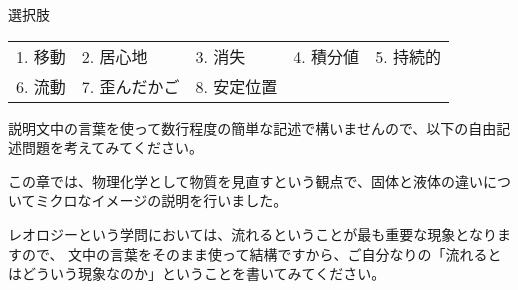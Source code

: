\documentclass[uplatex,dvipdfmx,a4paper,11pt]{jsarticle}
\begin{document}
\begin{qlist}
		\begin{itembox}[l]{選択肢}
			\begin{center}
				\begin{tabular}{lllll}
					1. 移動	&2. 居心地 	&3. 消失	&4. 積分値	&5. 持続的\\
					6. 流動	&7. 歪んだかご &8. 安定位置
				\end{tabular}
			\end{center}
		\end{itembox}
\end{qlist}

説明文中の言葉を使って数行程度の簡単な記述で構いませんので、以下の自由記述問題を考えてみてください。
\begin{qlist}
\qitem この章では、物理化学として物質を見直すという観点で、固体と液体の違いについてミクロなイメージの説明を行いました。

レオロジーという学問においては、流れるということが最も重要な現象となりますので、
文中の言葉をそのまま使って結構ですから、ご自分なりの「流れるとはどういう現象なのか」ということを書いてみてください。
\end{qlist}

\clearpage
\end{document}
